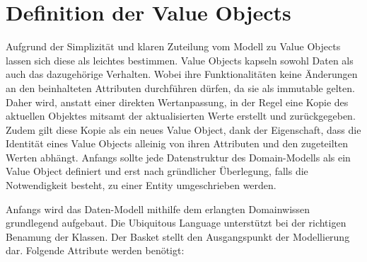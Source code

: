 \section{Definition der Value Objects}
Aufgrund der Simplizität und klaren Zuteilung vom Modell zu Value Objects lassen sich diese als leichtes bestimmen. Value Objects kapseln sowohl Daten als auch das dazugehörige Verhalten. Wobei ihre Funktionalitäten keine Änderungen an den beinhalteten Attributen durchführen dürfen, da sie als immutable gelten. Daher wird, anstatt einer direkten Wertanpassung, in der Regel eine Kopie des aktuellen Objektes mitsamt der aktualisierten Werte erstellt und zurückgegeben. Zudem gilt diese Kopie als ein neues Value Object, dank der Eigenschaft, dass die Identität eines Value Objects alleinig von ihren Attributen und den zugeteilten Werten abhängt. Anfangs sollte jede Datenstruktur des Domain-Modells als ein Value Object definiert und erst nach gründlicher Überlegung, falls die Notwendigkeit besteht, zu einer Entity umgeschrieben werden.

Anfangs wird das Daten-Modell mithilfe dem erlangten Domainwissen grundlegend aufgebaut. Die Ubiquitous Language unterstützt bei der richtigen Benamung der Klassen. Der Basket stellt den Ausgangspunkt der Modellierung dar. Folgende Attribute werden benötigt:


